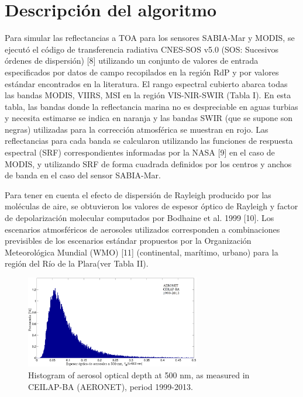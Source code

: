 \section{Descripción del algoritmo}

Para simular las reflectancias a TOA para los sensores SABIA-Mar y MODIS, se ejecutó el código de transferencia radiativa CNES-SOS v5.0 (SOS: Sucesivos órdenes de dispersión) [8] utilizando un conjunto de valores de entrada especificados por datos de campo recopilados en la región RdP y por valores estándar encontrados en la literatura.
El rango espectral cubierto abarca todas las bandas MODIS, VIIRS, MSI en la región VIS-NIR-SWIR (Tabla I). En esta tabla, las bandas donde la reflectancia marina no es despreciable en aguas turbias y necesita estimarse se indica en naranja y las bandas SWIR (que se supone son negras) utilizadas para la corrección atmosférica se muestran en rojo. Las reflectancias para cada banda se calcularon utilizando las funciones de respuesta espectral (SRF) correspondientes informadas por la NASA [9] en el caso de MODIS, y utilizando SRF de forma cuadrada definidos por los centros y anchos de banda en el caso del sensor SABIA-Mar.



Para tener en cuenta el efecto de dispersión de Rayleigh producido por las moléculas de aire, se obtuvieron los valores de espesor óptico de Rayleigh y factor de depolarización molecular computados por Bodhaine et al. 1999 [10]. Los escenarios atmosféricos de aerosoles utilizados corresponden a combinaciones previsibles de los escenarios estándar propuestos por la Organización Meteorológica Mundial (WMO) [11] (continental, marítimo, urbano) para la región del Río de la Plara(ver Tabla II).

\begin{figure}
\centering
\includegraphics[width=3.0in]{pca/figures/TAU_AERONET.png}
\caption{Histogram of aerosol optical depth at 500 nm, as measured in CEILAP-BA (AERONET), period 1999-2013.}
\label{pca:tauaeronet}
\end{figure}

